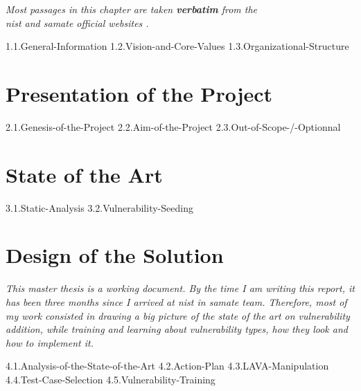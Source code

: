 \documentclass{tnreport}
\begin{document}
    \vfill
    
    \begin{center}
        \emph{Most passages in this chapter are taken \textbf{verbatim} from the\\\textcolor{custom-blue}{\gls{nist}} and {\color{custom-blue}\gls{samate}} official websites \cite{nist2016official,samate2016official}.}
    \end{center}
    
    \vfill
    
    {1.1.General-Information}
    {1.2.Vision-and-Core-Values}
    {1.3.Organizational-Structure}

\cleardoublepage

\chapter{Presentation of the Project}

    {2.1.Genesis-of-the-Project}
    {2.2.Aim-of-the-Project}
    {2.3.Out-of-Scope-/-Optionnal}

\cleardoublepage

\chapter{State of the Art}

    {3.1.Static-Analysis}
    {3.2.Vulnerability-Seeding}

\cleardoublepage

\chapter{Design of the Solution}
\label{cpt:design-of-the-solution}

\vspace{-1.1cm}

\textit{This master thesis is a working document. By the time I am writing this report, it has been three months since I arrived at \gls{nist} in \gls{samate} team. Therefore, most of my work consisted in drawing a big picture of the state of the art on vulnerability addition, while training and learning about vulnerability types, how they look and how to implement it.}

\vspace{-0.1cm}

    {4.1.Analysis-of-the-State-of-the-Art}
    {4.2.Action-Plan}
    {4.3.LAVA-Manipulation}
    {4.4.Test-Case-Selection}
    {4.5.Vulnerability-Training}
\end{document}
